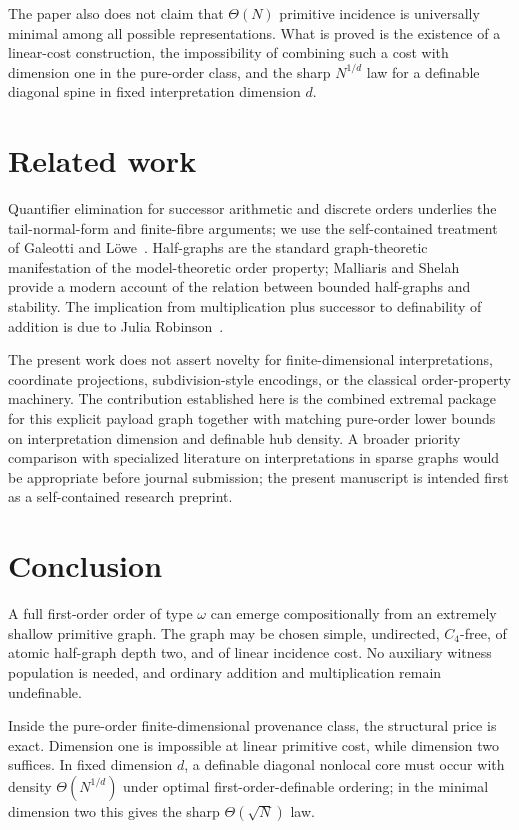 \documentclass[11pt]{article}
\theoremstyle{definition}
\begin{document}
The paper also does not claim that $\Theta(N)$ primitive incidence is universally minimal among all possible representations.  What is proved is the existence of a linear-cost construction, the impossibility of combining such a cost with dimension one in the pure-order class, and the sharp $N^{1/d}$ law for a definable diagonal spine in fixed interpretation dimension $d$.

\section{Related work}

Quantifier elimination for successor arithmetic and discrete orders underlies the tail-normal-form and finite-fibre arguments; we use the self-contained treatment of Galeotti and L\"owe~\cite{GaleottiLoewe2022}.  Half-graphs are the standard graph-theoretic manifestation of the model-theoretic order property; Malliaris and Shelah~\cite{MalliarisShelah2014} provide a modern account of the relation between bounded half-graphs and stability.  The implication from multiplication plus successor to definability of addition is due to Julia Robinson~\cite{Robinson1949}.

The present work does not assert novelty for finite-dimensional interpretations, coordinate projections, subdivision-style encodings, or the classical order-property machinery.  The contribution established here is the combined extremal package for this explicit payload graph together with matching pure-order lower bounds on interpretation dimension and definable hub density.  A broader priority comparison with specialized literature on interpretations in sparse graphs would be appropriate before journal submission; the present manuscript is intended first as a self-contained research preprint.

\section{Conclusion}

A full first-order order of type $\omega$ can emerge compositionally from an extremely shallow primitive graph.  The graph may be chosen simple, undirected, $C_4$-free, of atomic half-graph depth two, and of linear incidence cost.  No auxiliary witness population is needed, and ordinary addition and multiplication remain undefinable.

Inside the pure-order finite-dimensional provenance class, the structural price is exact.  Dimension one is impossible at linear primitive cost, while dimension two suffices.  In fixed dimension $d$, a definable diagonal nonlocal core must occur with density $\Theta(N^{1/d})$ under optimal first-order-definable ordering; in the minimal dimension two this gives the sharp $\Theta(\sqrt N)$ law.
\end{document}
